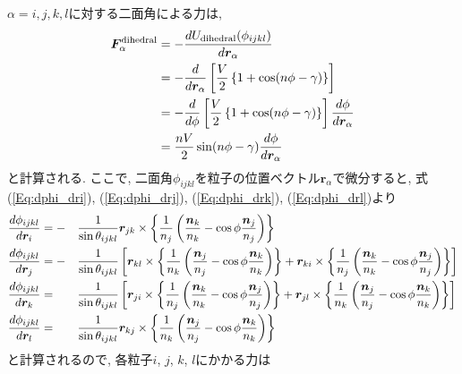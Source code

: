 $\alpha = i, j, k, l$に対する二面角による力は, 
\begin{align}
     \bm{F}_{\alpha}^{\mathrm{dihedral}}
 &=
   - \frac{d U_{\mathrm{dihedral}}(\phi_{ijkl})}{d \bm{r}_{\alpha}}
 \notag \\
 &=
   - \frac{d}{d \bm{r}_{\alpha}}
     \left[
            \frac{V}{2}
            \left\{ 1 + \cos(n\phi-\gamma) \right\}
     \right]
 \notag \\
 &=
   - \frac{d}{d \phi}
     \left[
            \frac{V}{2}
            \left\{ 1 + \cos(n\phi-\gamma) \right\}
     \right]
     \frac{d \phi}{d \bm{r}_{\alpha}}
 \notag \\
 &=
 \frac{nV}{2} \sin(n\phi - \gamma) \frac{d \phi}{d \bm{r}_{\alpha}}
 \notag
\end{align}
と計算される. ここで, 二面角$\phi_{ijkl}$を粒子の位置ベクトル$\bm{r}_{\alpha}$で微分すると,
式(\ref{Eq:dphi_dri}), (\ref{Eq:dphi_drj}), (\ref{Eq:dphi_drk}), (\ref{Eq:dphi_drl})より
\begin{alignat}{4}
   \frac{d \phi_{ijkl}}{d \bm{r}_{i}}
   &=
   -&&
   \frac{1}{\sin \theta_{ijkl}}
   \bm{r}_{jk} \times
   \left\{
          \frac{1}{n_{j}}
          \left(
                 \frac{\bm{n}_{k}}{n_{k}} - \cos\phi \frac{\bm{n}_{j}}{n_{j}}
          \right)
   \right\}
   \notag
   \\
   \frac{d \phi_{ijkl}}{d \bm{r}_{j}}
   &=
   -&&
   \frac{1}{\sin \theta_{ijkl}}
   \left[
      \bm{r}_{kl} \times
      \left\{
             \frac{1}{n_{k}}
             \left(
                    \frac{\bm{n}_{j}}{n_{j}} - \cos\phi \frac{\bm{n}_{k}}{n_{k}}
             \right)
      \right\}
    +
      \bm{r}_{ki} \times
      \left\{
             \frac{1}{n_{j}}
             \left(
                    \frac{\bm{n}_{k}}{n_{k}} - \cos\phi \frac{\bm{n}_{j}}{n_{j}}
             \right)
      \right\}
   \right]
   \notag
   \\
   \frac{d \phi_{ijkl}}{d \bm{r}_{k}}
   &=&&
   \frac{1}{\sin \theta_{ijkl}}
   \left[
      \bm{r}_{ji} \times
      \left\{
             \frac{1}{n_{j}}
             \left(
                    \frac{\bm{n}_{k}}{n_{k}} - \cos\phi \frac{\bm{n}_{j}}{n_{j}}
             \right)
      \right\}
    +
      \bm{r}_{jl} \times
      \left\{
             \frac{1}{n_{k}}
             \left(
                    \frac{\bm{n}_{j}}{n_{j}} - \cos\phi \frac{\bm{n}_{k}}{n_{k}}
             \right)
      \right\}
   \right]
   \notag
   \\
   \frac{d \phi_{ijkl}}{d \bm{r}_{l}}
   &=&&
   \frac{1}{\sin \theta_{ijkl}}
   \bm{r}_{kj} \times
   \left\{
          \frac{1}{n_{k}}
          \left(
                 \frac{\bm{n}_{j}}{n_{j}} - \cos\phi \frac{\bm{n}_{k}}{n_{k}}
          \right)
   \right\}
   \notag
\end{alignat}
と計算されるので, 各粒子$i$, $j$, $k$, $l$にかかる力は


